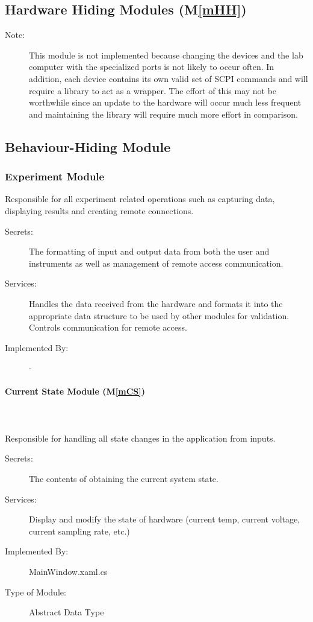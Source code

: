 \documentclass[12pt, titlepage]{article}
\newcommand{\mref}[1]{M\ref{#1}}
\begin{document}
\subsection{Hardware Hiding Modules (\mref{mHH})}

\begin{description}
\item[Note:]This module is not implemented because changing the devices and the lab computer with the specialized ports is not likely to occur often. In addition, each device contains its own valid set of SCPI commands and will require a library to act as a wrapper. The effort of this may not be worthwhile since an update to the hardware will occur much less frequent and maintaining the library will require much more effort in comparison. 

\end{description}

\subsection{Behaviour-Hiding Module}

\subsubsection{Experiment Module}
Responsible for all experiment related operations such as capturing data, displaying results and creating remote connections.
\begin{description}
  \item[Secrets:] The formatting of input and output data from both the user and instruments as well as management of remote access communication.
  \item[Services:] Handles the data received from the hardware and formats it into the appropriate data structure to be used by other modules for validation. Controls communication for remote access. 
  \item[Implemented By:] -
  \end{description}

\paragraph{Current State Module (\mref{mCS})}
\\~\\
Responsible for handling all state changes in the application from inputs.
\begin{description}
\item[Secrets:]The contents of obtaining the current system state.
\item[Services:]Display and modify the state of hardware (current temp, current voltage, current sampling rate, etc.)
\item[Implemented By:] MainWindow.xaml.cs
\item[Type of Module:] Abstract Data Type
\end{description}
\end{document}
